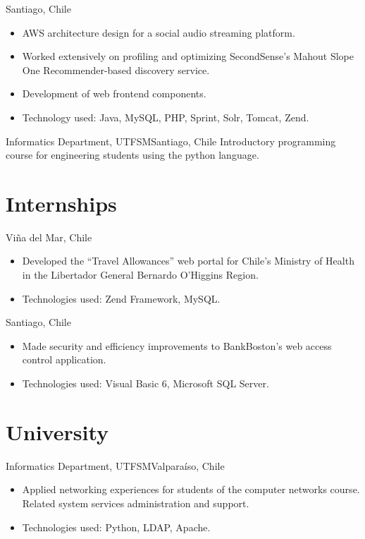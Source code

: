 \documentclass[sans,letter]{moderncv}
\begin{document}
{Santiago, Chile}{}{\begin{itemize}
  \item AWS architecture design for a social audio streaming platform.
  \item Worked extensively on profiling and optimizing SecondSense's Mahout Slope One Recommender-based discovery service.
  \item Development of web frontend components.
  \item Technology used: Java, MySQL, PHP, Sprint, Solr, Tomcat, Zend.
\end{itemize}}

{Informatics Department, UTFSM}{Santiago, Chile}{}
{Introductory programming course for engineering students using the
python language.}

\section{Internships}

{Viña del Mar, Chile}{}{\begin{itemize}
\item Developed the ``Travel Allowances'' web portal for Chile’s Ministry of Health in the Libertador General Bernardo O'Higgins Region.
\item Technologies used: Zend Framework, MySQL.
\end{itemize}}

{Santiago, Chile}{}{\begin{itemize}
  \item Made security and efficiency improvements to BankBoston's web access
  control application.
  \item Technologies used: Visual Basic 6, Microsoft SQL Server.
\end{itemize}}

\section{University}

{Informatics Department, UTFSM}{Valparaíso, Chile}{}
{
\begin{itemize}
\item Applied networking experiences for students of the computer networks
course. Related system services administration and support.
\item Technologies used: Python, LDAP, Apache.
\end{itemize}
}
\end{document}
